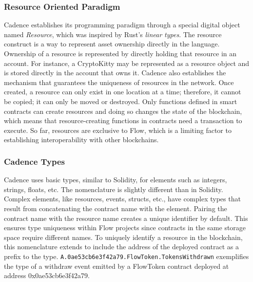 \documentclass[../NFTComp_IEEE.tex]{subfiles}
\begin{document}
\subsubsection{Resource Oriented Paradigm}
\label{sec:resource_oriented_paradigm}
Cadence establishes its programming paradigm through a special digital object named \textit{Resource}, which was inspired by Rust's \textit{linear types}. The resource construct is a way to represent asset ownership directly in the language. Ownership of a resource is represented by directly holding that resource in an account. For instance, a CryptoKitty may be represented as a resource object and is stored directly in the account that owns it.
Cadence also establishes the mechanism that guarantees the uniqueness of resources in the network. Once created, a resource can only exist in one location at a time; therefore, it cannot be copied; it can only be moved or destroyed. Only functions defined in smart contracts can create resources and doing so changes the state of the blockchain, which means that resource-creating functions in contracts need a transaction to execute. So far, resources are exclusive to Flow, which is a limiting factor to establishing interoperability with other blockchains.

\subsubsection{Cadence Types}
Cadence uses basic types, similar to Solidity, for elements such as integers, strings, floats, etc. The nomenclature is slightly different than in Solidity. Complex elements, like resources, events, structs, etc., have complex types that result from concatenating the contract name with the element. Pairing the contract name with the resource name creates a unique identifier by default. This ensures type uniqueness within Flow projects since contracts in the same storage space require different names. To uniquely identify a resource in the blockchain, this nomenclature extends to include the address of the deployed contract as a prefix to the type. \verb|A.0ae53cb6e3f42a79.FlowToken.TokensWithdrawn| exemplifies the type of a withdraw event emitted by a FlowToken contract deployed at address 0x0ae53cb6e3f42a79.
\end{document}
